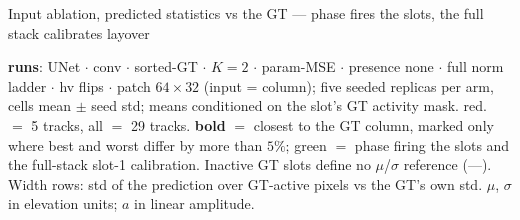 \begin{frame}{Input ablation, predicted statistics vs the GT --- phase fires the slots, the full stack calibrates layover}
  \par\vspace{3pt}
  \parbox{0.82\textwidth}{\tiny\color{soft} \textbf{runs}: UNet $\cdot$ conv $\cdot$ sorted-GT $\cdot$ $K{=}2$ $\cdot$ param-MSE $\cdot$ presence none $\cdot$ full norm ladder $\cdot$ hv flips $\cdot$ patch $64{\times}32$ (input = column); five seeded replicas per arm, cells mean $\pm$ seed std; means conditioned on the slot's GT activity mask. red.\ $=$ 5 tracks, all $=$ 29 tracks. \textbf{bold} $=$ closest to the \textcolor{good}{GT} column, marked only where best and worst differ by more than $5\%$; \textcolor{good}{green} $=$ phase firing the slots and the full-stack slot-1 calibration. Inactive GT slots define no $\mu$/$\sigma$ reference (---). Width rows: std of the prediction over GT-active pixels vs the GT's own std. $\mu$, $\sigma$ in elevation units; $a$ in linear amplitude.\par}
    

\end{frame}
